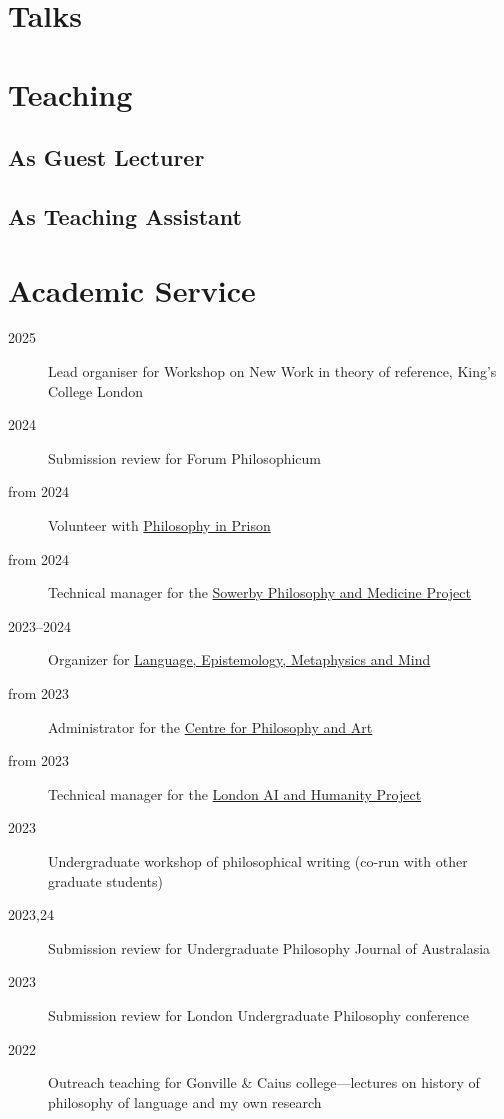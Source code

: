 \documentclass{cv}
\begin{document}
\section*{Talks }
\printbibliography[check=Presentation]{}

\section*{Teaching}
\subsection*{As Guest Lecturer}
\printbibliography[env=teaching,check=Teaching+GuestLecturer]{}

\subsection*{As Teaching Assistant}
\printbibliography[env=teaching,check=Teaching+TA]{}

\section*{Academic Service}
\begin{description}
\item[{2025}] Lead organiser for Workshop on New Work in theory of reference, King's College London
\item[{2024}] Submission review for Forum Philosophicum
\item[{from 2024}] Volunteer with \href{https://www.philosophyinprison.com/}{Philosophy in Prison}
\item[{from 2024}] Technical manager for the \href{https://www.philosophyandmedicine.org/}{Sowerby Philosophy and
Medicine Project}
\item[{2023--2024}] Organizer for \href{https://www.lemm-london.co.uk/}{Language, Epistemology, Metaphysics and Mind}
\item[{from 2023}] Administrator for the \href{https://philosophyarts.co.uk/}{Centre for Philosophy and Art}
\item[{from 2023}] Technical manager for the \href{https://www.ai-humanity-london.com/}{London AI and Humanity Project}
\item[{2023}] Undergraduate workshop of philosophical writing (co-run with other graduate students)
\item[{2023,24}] Submission review for Undergraduate Philosophy
  Journal of Australasia
\item[{2023}] Submission review for London Undergraduate Philosophy
conference
\item[{2022}] Outreach teaching for Gonville \& Caius college---lectures on
history of philosophy of language and my own research
\end{description}
\end{document}
